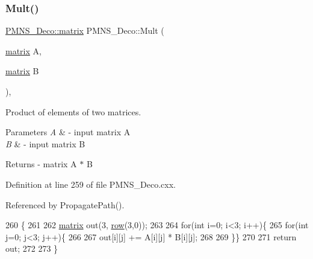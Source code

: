 \subsubsection{\texorpdfstring{Mult()}{Mult()}}
{\footnotesize\ttfamily \hyperlink{classOscProb_1_1PMNS__Deco_a77b4e0c041b6268910a270be0f5387c9}{P\+M\+N\+S\+\_\+\+Deco\+::matrix} P\+M\+N\+S\+\_\+\+Deco\+::\+Mult (\begin{DoxyParamCaption}\item[{\hyperlink{classOscProb_1_1PMNS__Deco_a77b4e0c041b6268910a270be0f5387c9}{matrix}}]{A,  }\item[{\hyperlink{classOscProb_1_1PMNS__Deco_a77b4e0c041b6268910a270be0f5387c9}{matrix}}]{B }\end{DoxyParamCaption})\hspace{0.3cm}{\ttfamily [protected]}, {\ttfamily [virtual]}}

Product of elements of two matrices.


\begin{DoxyParams}{Parameters}
{\em A} & -\/ input matrix A \\
\hline
{\em B} & -\/ input matrix B\\
\hline
\end{DoxyParams}
\begin{DoxyReturn}{Returns}
-\/ matrix A $\ast$ B 
\end{DoxyReturn}


Definition at line 259 of file P\+M\+N\+S\+\_\+\+Deco.\+cxx.



Referenced by Propagate\+Path().


\begin{DoxyCode}
260 \{
261 
262   \hyperlink{classOscProb_1_1PMNS__Deco_a77b4e0c041b6268910a270be0f5387c9}{matrix} out(3, \hyperlink{classOscProb_1_1PMNS__Deco_a430859c3da89582de577f8f7e75f2d16}{row}(3,0));
263   
264   \textcolor{keywordflow}{for}(\textcolor{keywordtype}{int} i=0; i<3; i++)\{
265   \textcolor{keywordflow}{for}(\textcolor{keywordtype}{int} j=0; j<3; j++)\{
266   
267     out[i][j] += A[i][j] * B[i][j];
268 
269   \}\}
270   
271   \textcolor{keywordflow}{return} out;
272 
273 \}
\end{DoxyCode}
\mbox{\label{classOscProb_1_1PMNS__Deco_aa81f47ea36207b90a5feb9849060032d}} 
